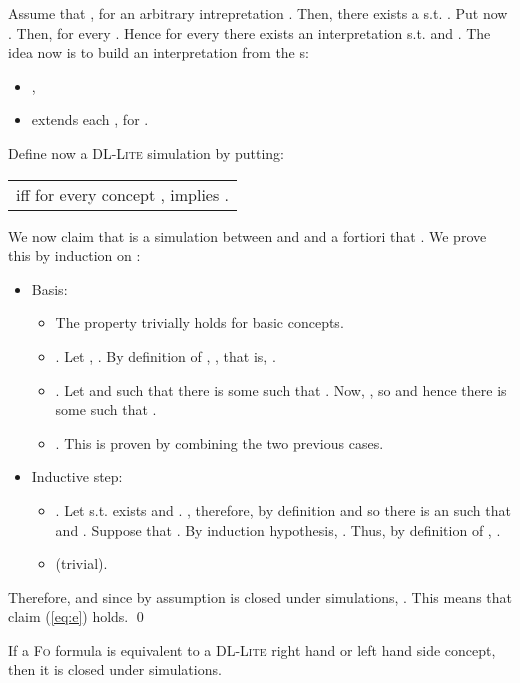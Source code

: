 \documentclass[11pt]{llncs}
\newcommand{\logic}[1]{\textsc{#1}\xspace}
\newcommand{\FOL}{\logic{Fo}}
\newcommand{\g}[1]{\logic{#1}}
\begin{document}
Assume that , 
for an arbitrary intrepretation .
Then, there exists a
 s.t. .
Put now . Then, for every . 
Hence for every 
there exists an interpretation  
s.t.  and .
The idea now is to build an interpretation  from the
s:
\begin{itemize}
\item ,
\item  extends each , for .
\end{itemize}
Define now a \g{DL-Lite} simulation  by putting:
\begin{center}
\begin{tabular}{c}
 iff for every concept ,  implies .
\end{tabular}
\end{center}
We now claim that  is a  simulation
between  and  and a fortiori that
.
We prove this by induction on :
\begin{itemize}
\item Basis:
\begin{itemize}
\item The property trivially holds for basic concepts. 
\item . Let ,
. By definition of , , that is,
.
\item . Let 
and  such that there is some 
such that . Now, , so
 and hence there is some 
such that .
\item . This is proven by combining the two
previous cases.
\end{itemize}
\item Inductive step:
\begin{itemize}
\item . Let  s.t.
exists  and
. ,
therefore,  by definition
and so there is an  such that 
and . Suppose that
. By induction hypothesis, .
Thus, by definition of ,
.
\item  (trivial).
\end{itemize}
\end{itemize}

Therefore,  
and since by assumption  is closed under
 simulations, .
This means that claim (\ref{eq:e}) holds. \qed


\begin{lemma}
If a \FOL formula  is equivalent to a \g{DL-Lite}
right hand or left hand side concept, then it is closed
under  simulations.
\end{lemma}
\end{document}
